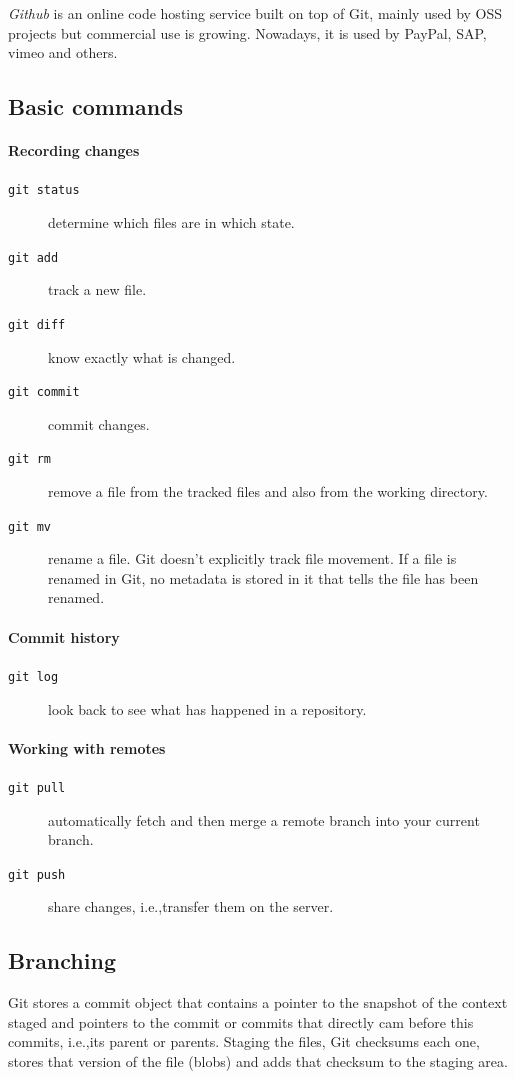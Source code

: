 \emph{Github} is an online code hosting service built on top of Git, mainly used by OSS projects but commercial use is growing. Nowadays, it is used by PayPal, SAP, vimeo and others.

\subsection{Basic commands}
\paragraph{Recording changes}
\begin{description}
\item [\texttt{git status}] determine which files are in which state.
\item [\texttt{git add}] track a new file.
\item [\texttt{git diff}] know exactly what is changed.
\item [\texttt{git commit}] commit changes.
\item [\texttt{git rm}] remove a file from the tracked files and also from the working directory.
\item [\texttt{git mv}] rename a file. Git doesn't explicitly track file movement. If a file is renamed in Git, no metadata is stored in it that tells the file has been renamed.
\end{description}

\paragraph{Commit history}
\begin{description}
\item [\texttt{git log}] look back to see what has happened in a repository.
\end{description}

\paragraph{Working with remotes}
\begin{description}
\item [\texttt{git pull}] automatically fetch and then merge a remote branch into your current branch.
\item [\texttt{git push}] share changes, i.e.,\@ transfer them on the server.
\end{description}

\subsection{Branching}
Git stores a commit object that contains a pointer to the snapshot of the context staged and pointers to the commit or commits that directly cam before this commits, i.e.,\@ its parent or parents. Staging the files, Git checksums each one, stores that version of the file (blobs) and adds that checksum to the staging area.

